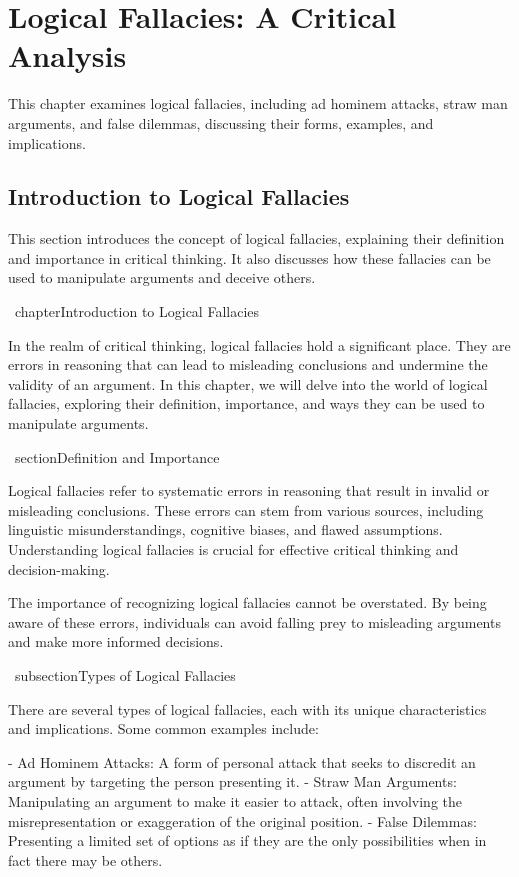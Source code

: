 \documentclass{report}%
\begin{document}
{{{{{{{{{{{{{{\chapter{Logical Fallacies: A Critical Analysis}%
This chapter examines logical fallacies, including ad hominem attacks, straw man arguments, and false dilemmas, discussing their forms, examples, and implications.

%
\section{Introduction to Logical Fallacies}%
This section introduces the concept of logical fallacies, explaining their definition and importance in critical thinking. It also discusses how these fallacies can be used to manipulate arguments and deceive others.

%
\ chapter{Introduction to Logical Fallacies}

In the realm of critical thinking, logical fallacies hold a significant place. They are errors in reasoning that can lead to misleading conclusions and undermine the validity of an argument. In this chapter, we will delve into the world of logical fallacies, exploring their definition, importance, and ways they can be used to manipulate arguments.

\ section{Definition and Importance}

Logical fallacies refer to systematic errors in reasoning that result in invalid or misleading conclusions. These errors can stem from various sources, including linguistic misunderstandings, cognitive biases, and flawed assumptions. Understanding logical fallacies is crucial for effective critical thinking and decision-making.

The importance of recognizing logical fallacies cannot be overstated. By being aware of these errors, individuals can avoid falling prey to misleading arguments and make more informed decisions.

\ subsection{Types of Logical Fallacies}

There are several types of logical fallacies, each with its unique characteristics and implications. Some common examples include:

- Ad Hominem Attacks: A form of personal attack that seeks to discredit an argument by targeting the person presenting it.
- Straw Man Arguments: Manipulating an argument to make it easier to attack, often involving the misrepresentation or exaggeration of the original position.
- False Dilemmas: Presenting a limited set of options as if they are the only possibilities when in fact there may be others.

}}}}}}}}}}}}}}
\end{document}
